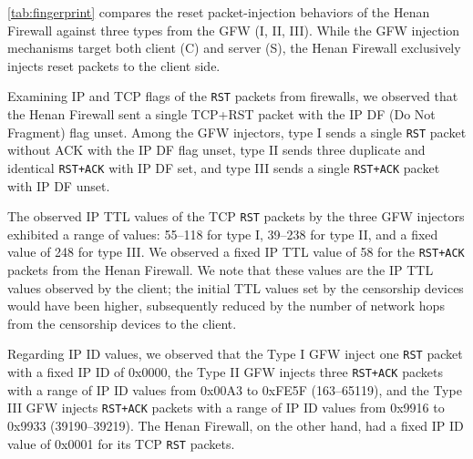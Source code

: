 \documentclass[conference,compsoc]{IEEEtran}
\begin{document}
%

\autoref{tab:fingerprint} compares the reset packet-injection behaviors of the Henan Firewall
against three types from the GFW (I, II, III).
While the GFW injection mechanisms target both client (C) and server (S),
the Henan Firewall exclusively injects reset packets to the client side.

Examining IP and TCP flags of the \texttt{RST} packets from firewalls,
we observed that the Henan Firewall sent a single TCP+RST packet with the IP DF (Do Not Fragment) flag unset.
Among the GFW injectors, type I sends a single \texttt{RST} packet without ACK with the IP DF flag unset,
type II sends three duplicate and identical \texttt{RST+ACK} with IP DF set,
and type III sends a single \texttt{RST+ACK} packet with IP DF unset.

The observed IP TTL values of the TCP \texttt{RST} packets by the three GFW injectors
exhibited a range of values: 55--118 for type I, 39--238 for type II, and a fixed value of 248 for type III.
We observed a fixed IP TTL value of 58 for the \texttt{RST+ACK} packets from the Henan Firewall.
We note that these values are
the IP TTL values observed by the client;
the initial TTL values set by the censorship devices would have been higher,
subsequently reduced by the number of network hops from the censorship devices to the client.


Regarding IP ID values,
we observed that the Type I GFW inject one \texttt{RST} packet with a fixed IP ID of 0x0000,
the Type II GFW injects three \texttt{RST+ACK} packets with a range of IP ID values from 0x00A3 to 0xFE5F (163--65119),
and the Type III GFW injects \texttt{RST+ACK} packets with a range of IP ID values from 0x9916 to 0x9933 (39190--39219).
The Henan Firewall,
on the other hand,
had a fixed IP ID value of 0x0001 for its TCP \texttt{RST} packets.
\end{document}
